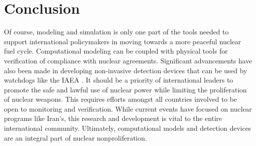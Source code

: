 \documentclass{article}
\begin{document}
\section{Conclusion}

Of course, modeling and simulation is only one part of the tools needed to support international policymakers in moving towards a more peaceful nuclear fuel cycle. Computational modeling can be coupled with physical tools for verification of compliance with nuclear agreements. Significant advancements have also been made in developing non-invasive detection devices that can be used by watchdogs like the IAEA \cite{origin}. It should be a priority of international leaders to promote the safe and lawful use of nuclear power while limiting the proliferation of nuclear weapons. This requires efforts amongst all countries involved to be open to monitoring and verification. While current events have focused on nuclear programs like Iran’s, this research and development is vital to the entire international community.  Ultimately, computational models and detection devices are an integral part of nuclear nonproliferation.



\end{document}
